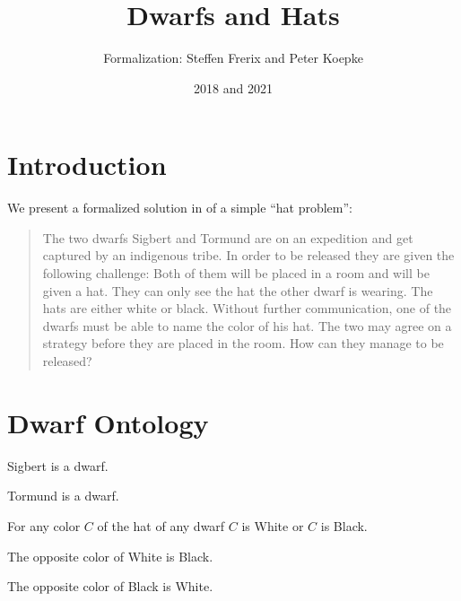 \documentclass[english]{article}
\title{Dwarfs and Hats}
\author{\Naproche Formalization: Steffen Frerix and Peter Koepke}
\date{2018 and 2021}
\begin{document}
\maketitle

\begin{forthel}
\end{forthel}


\section{Introduction}

We present a formalized solution in \Naproche of a simple ``hat problem'':

\begin{quotation}
  \noindent The two dwarfs Sigbert and Tormund are on an expedition and get captured by an indigenous tribe.
  In order to be released they are given the following challenge:
  Both of them will be placed in a room and will be given a hat.
  They can only see the hat the other dwarf is wearing.
  The hats are either white or black.
  Without further communication, one of the dwarfs must be able to name the color of his hat.
  The two may agree on a strategy before they are placed in the room.
  How can they manage to be released?
\end{quotation}


\section{Dwarf Ontology}

\begin{forthel}
  \begin{signature}
    Sigbert is a dwarf.
  \end{signature}
  \begin{signature}
    Tormund is a dwarf.
  \end{signature}
  \begin{axiom}
    For any color $C$ of the hat of any dwarf $C$ is White or $C$ is Black.
  \end{axiom}
  \begin{axiom}
    The opposite color of White is Black.
  \end{axiom}
  \begin{axiom}
    The opposite color of Black is White.
  \end{axiom}
\end{forthel}
\end{document}
